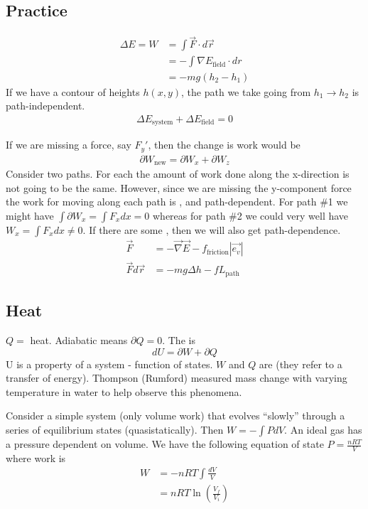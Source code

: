 \documentclass[12pt]{article}
\begin{document}
\subsection{Practice}
\begin{align*}
\Delta E = W &= \int \vec{F} \cdot d\vec{r}\\
& = -\int \nabla E_\text{field} \cdot dr\\
& = - mg(h_2 - h_1)
\end{align*}
If we have a contour of heights $h(x,y)$, the path we take going from $h_1 \rightarrow h_2$ is path-independent.
\begin{align*}
\Delta E_\text{system} + \Delta E_\text{field} = 0
\end{align*}

  If we are missing a force, say $F_y'$, then the change is work would be
\begin{align*}
\partial W_\text{new} = \partial W_x + \partial W_z
\end{align*}
Consider two paths.  For each the amount of work done along the x-direction is not going to be the same.  However, since we are missing the y-component force the work for moving along each path is , and path-dependent.  For path \#1 we might have $\int \partial W_x = \int F_x dx = 0$ whereas for path \#2 we could very well have $W_x = \int F_x dx \neq 0$.  If there are some , then we will also get path-dependence.
\begin{align*}
\vec{F} &= -\vec{\nabla}\vec{E} - f_\text{friction} | \vec{e_v}|\\
\vec{F}d\vec{r} &= -mg\Delta h- f L_\text{path}
\end{align*} 

\subsection{Heat}
$Q =$ heat.  Adiabatic means $\partial Q = 0$.  The  is
\begin{equation}\boxed{
dU = \partial W + \partial Q
}\end{equation}
U is a property of a system - function of states.  $W$ and $Q$ are  (they refer to a transfer of energy).  Thompson (Rumford) measured mass change with varying temperature in water to help observe this phenomena.

 Consider a simple system (only volume work) that evolves ``slowly'' through a series of equilibrium states (quasistatically).  Then $W = -\int P dV$.  An ideal gas has a pressure dependent on volume.  We have the following equation of state $P = \frac{nRT}{V}$ where work is
\begin{align*}
W &= -nRT\int \frac{dV}{V}\\
&= nRT \ln(\frac{V_f}{V_i})
\end{align*}
\end{document}
